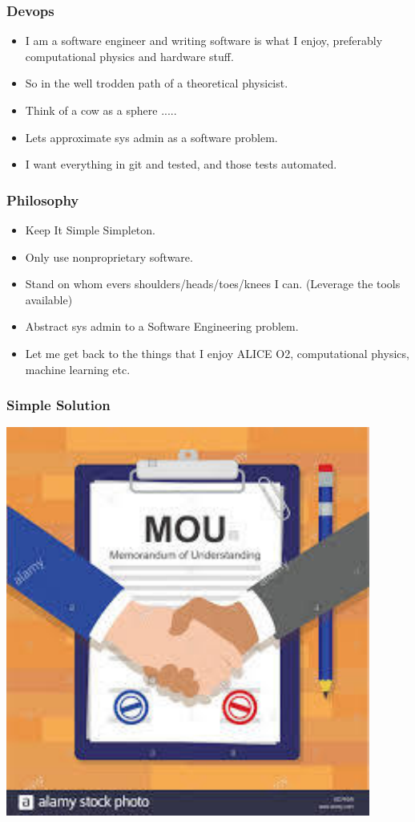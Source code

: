 \documentclass{beamer}
\begin{document}
\begin{frame}
  \frametitle{Devops}
    \begin{itemize}
            \item I am a software engineer and writing software is what I enjoy, preferably computational physics and hardware stuff.
                \item So in the well trodden path of a theoretical physicist.
                    \item Think of a cow as a sphere .....
                        \item Lets approximate sys admin as a software problem.
                        \item I want everything in git and tested, and those tests automated.
    \end{itemize}

\end{frame}
\begin{frame}
  \frametitle{Philosophy}
  \begin{itemize}
    \item Keep It Simple Simpleton.
    \item Only use nonproprietary software.
    \item Stand on whom evers shoulders/heads/toes/knees I can. (Leverage the tools available)
    \item Abstract sys admin to a Software Engineering problem.
    \item Let me get back to the things that I enjoy ALICE O2, computational physics, machine learning etc.
  \end{itemize}
\end{frame}

\begin{frame}
  \frametitle{Simple Solution}
    \center\includegraphics[scale=0.5]{MOU-pic.pdf} \\
\end{frame}
\end{document}
